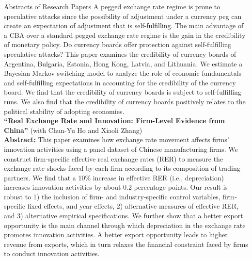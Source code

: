 \documentclass{resume_liang} %
\begin{document}
\begin{rSection}{Abstracts of Research Papers}
	A pegged exchange rate regime is prone to speculative attacks since the possibility of adjustment under a currency peg can create an expectation of adjustment that is self-fulfilling. The main advantage of a CBA over a standard pegged exchange rate regime is the gain in the credibility of monetary policy. Do currency boards offer protection against self-fulfilling speculative attacks? This paper examines the credibility of currency boards of Argentina, Bulgaria, Estonia, Hong Kong, Latvia, and Lithuania. We estimate a Bayesian Markov switching model to analyze the role of economic fundamentals and self-fulfilling expectations in accounting for the credibility of the currency board. We find that the credibility of currency boards is subject to self-fulfilling runs. We also find that the credibility of currency boards positively relates to the political stability of adopting economies.\\
	
	\textbf{``Real Exchange Rate and Innovation: Firm-Level Evidence from China''} (with Chun-Yu Ho and Xiaoli Zhang) \vspace{0.1cm}\\
	\textbf{Abstract:} This paper examines how exchange rate movement affects firms' innovation activities using a panel dataset of Chinese manufacturing firms. We construct firm-specific effective real exchange rates (RER) to measure the exchange rate shocks faced by each firm according to its composition of trading partners. We find that a 10\% increase in effective RER (i.e., depreciation) increases innovation activities by about 0.2 percentage points. Our result is robust to 1) the inclusion of firm- and industry-specific control variables, firm-specific fixed effects, and year effects, 2) alternative measures of effective RER, and 3) alternative empirical specifications. We further show that a better export opportunity is the main channel through which depreciation in the exchange rate promotes innovation activities. A better export opportunity leads to higher revenue from exports, which in turn relaxes the financial constraint faced by firms to conduct innovation activities. \\
\end{rSection}
\bigskip \bigskip
\end{document}
